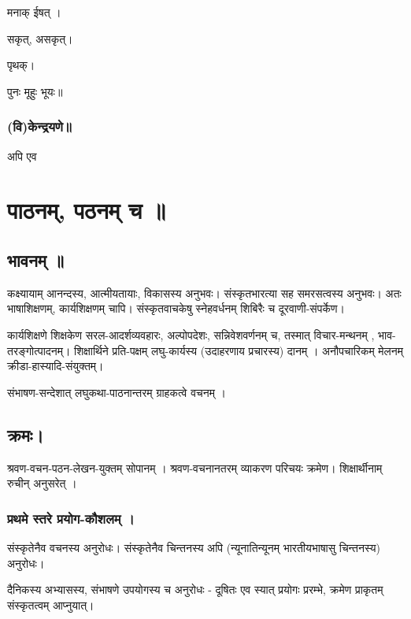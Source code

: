 \documentclass[oneside, article]{memoir}
\begin{document}
मनाक् ईषत् ।

सकृत्, असकृत्।

पृथक्।

पुनः मूहुः भूयः॥

\section{(वि)केन्द्रयणे॥}
अपि एव

\part{पाठनम्, पठनम् च ॥}
\chapter{भावनम् ॥}
कक्ष्यायाम् आनन्दस्य, आत्मीयतायाः, विकासस्य अनुभवः। संस्कृतभारत्या सह समरसत्वस्य अनुभवः। अतः भाषाशिक्षणम्, कार्यशिक्षणम् चापि। संस्कृतवाचकेषु स्नेहवर्धनम् शिबिरैः च दूरवाणी-संपर्केण।

कार्यशिक्षणे शिक्षकेण सरल-आदर्शव्यवहारः, अल्पोपदेशः, सन्निवेशवर्णनम् च, तस्मात् विचार-मन्थनम् , भाव-तरङ्गोत्पादनम्। शिक्षार्थिने प्रति-पक्षम् लघु-कार्यस्य (उदाहरणाय प्रचारस्य) दानम् । अनौपचारिकम् मेलनम् क्रीडा-हास्यादि-संयुक्तम्।

संभाषण-सन्देशात् लघुकथा-पाठनान्तरम् ग्राहकत्वे वचनम् ।

\chapter{क्रमः।}
श्रवण-वचन-पठन-लेखन-युक्तम् सोपानम् । श्रवण-वचनानतरम् व्याकरण परिचयः क्रमेण। शिक्षार्थीनाम् रुचीन् अनुसरेत् ।

\section{प्रथमे स्तरे प्रयोग-कौशलम् ।}
संस्कृतेनैव वचनस्य अनुरोधः। संस्कृतेनैव चिन्तनस्य अपि (न्यूनातिन्यूनम् भारतीयभाषासु चिन्तनस्य) अनुरोधः।

दैनिकस्य अभ्यासस्य, संभाषणे उपयोगस्य च अनुरोधः - दूषितः एव स्यात् प्रयोगः प्ररम्भे, क्रमेण प्राकृतम् संस्कृतत्वम् आप्नुयात्। 
\end{document}
